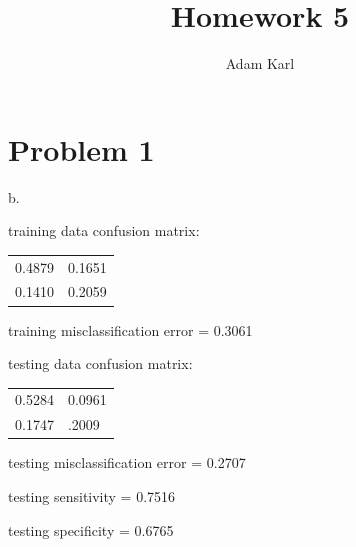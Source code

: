 \documentclass[a4paper]{article}
\title{Homework 5}
\author{Adam Karl}
\begin{document}
\maketitle

\section{Problem 1}

b. 

\noindent
training data confusion matrix: 
\begin{table}[htb]
\begin{tabular}{ll}
0.4879 & 0.1651 \\
0.1410 & 0.2059
\end{tabular}
\end{table}

\noindent
training misclassification error = 0.3061

\noindent
testing data confusion matrix:
\begin{table}[htb]
\begin{tabular}{ll}
0.5284 & 0.0961 \\
0.1747 & .2009 
\end{tabular}
\end{table}

\noindent
testing misclassification error = 0.2707

\noindent
testing sensitivity = 0.7516

\noindent 
testing specificity = 0.6765
\end{document}
